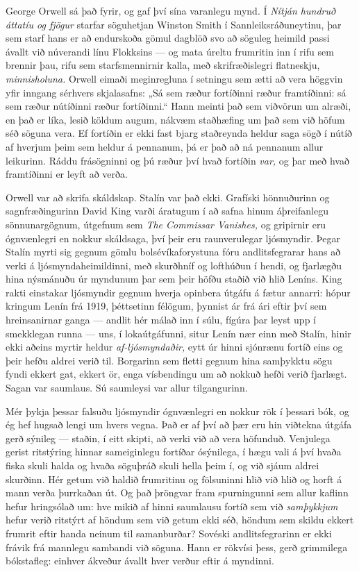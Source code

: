 George Orwell sá það fyrir, og gaf því sína varanlegu mynd. Í \emph{Nítján hundruð áttatíu og fjögur} starfar söguhetjan Winston Smith í Sannleiksráðuneytinu, þar sem starf hans er að endurskoða gömul dagblöð svo að söguleg heimild passi ávallt við núverandi línu Flokksins — og mata úreltu frumritin inn í rifu sem brennir þau, rifu sem starfsmennirnir kalla, með skrifræðislegri flatneskju, \emph{minnisholuna.} Orwell eimaði meginregluna í setningu sem ætti að vera höggvin yfir inngang sérhvers skjalasafns: „Sá sem ræður fortíðinni ræður framtíðinni: sá sem ræður nútíðinni ræður fortíðinni.“ Hann meinti það sem viðvörun um alræði, en það er líka, lesið köldum augum, nákvæm staðhæfing um það sem við höfum séð söguna vera. Ef fortíðin er ekki fast bjarg staðreynda heldur saga sögð í nútíð af hverjum þeim sem heldur á pennanum, þá er það að ná pennanum allur leikurinn. Ráddu frásögninni og þú ræður því hvað fortíðin \emph{var,} og þar með hvað framtíðinni er leyft að verða.

Orwell var að skrifa skáldskap. Stalín var það ekki. Grafíski hönnuðurinn og sagnfræðingurinn David King varði áratugum í að safna hinum áþreifanlegu sönnunargögnum, útgefnum sem \emph{The Commissar Vanishes,} og gripirnir eru ógnvænlegri en nokkur skáldsaga, því þeir eru raunverulegar ljósmyndir. Þegar Stalín myrti sig gegnum gömlu bolsévíkaforystuna fóru andlitsfegrarar hans að verki á ljósmyndaheimildinni, með skurðhníf og lofthúðun í hendi, og fjarlægðu hina nýsmánuðu úr myndunum þar sem þeir höfðu staðið við hlið Leníns. King rakti einstakar ljósmyndir gegnum hverja opinbera útgáfu á fætur annarri: hópur kringum Lenín frá 1919, þéttsetinn félögum, þynnist ár frá ári eftir því sem hreinsanirnar ganga — andlit hér málað inn í súlu, fígúra þar leyst upp í smekklegan runna — uns, í lokaútgáfunni, situr Lenín nær einn með Stalín, hinir ekki aðeins myrtir heldur \emph{af-ljósmyndaðir,} eytt úr hinni sjónrænu fortíð eins og þeir hefðu aldrei verið til. Borgarinn sem fletti gegnum hina samþykktu sögu fyndi ekkert gat, ekkert ör, enga vísbendingu um að nokkuð hefði verið fjarlægt. Sagan var saumlaus. Sú saumleysi var allur tilgangurinn.

Mér þykja þessar falsuðu ljósmyndir ógnvænlegri en nokkur rök í þessari bók, og ég hef hugsað lengi um hvers vegna. Það er af því að þær eru hin viðtekna útgáfa gerð sýnileg — staðin, í eitt skipti, að verki við að vera höfunduð. Venjulega gerist ritstýring hinnar sameiginlegu fortíðar ósýnilega, í hægu vali á því hvaða fiska skuli halda og hvaða söguþráð skuli hella þeim í, og við sjáum aldrei skurðinn. Hér getum við haldið frumritinu og fölsuninni hlið við hlið og horft á mann verða þurrkaðan út. Og það þröngvar fram spurningunni sem allur kaflinn hefur hringsólað um: hve mikið af hinni saumlausu fortíð sem við \emph{samþykkjum} hefur verið ritstýrt af höndum sem við getum ekki séð, höndum sem skildu ekkert frumrit eftir handa neinum til samanburðar? Sovéski andlitsfegrarinn er ekki frávik frá mannlegu sambandi við söguna. Hann er rökvísi þess, gerð grimmilega bókstafleg: einhver ákveður ávallt hver verður eftir á myndinni.

